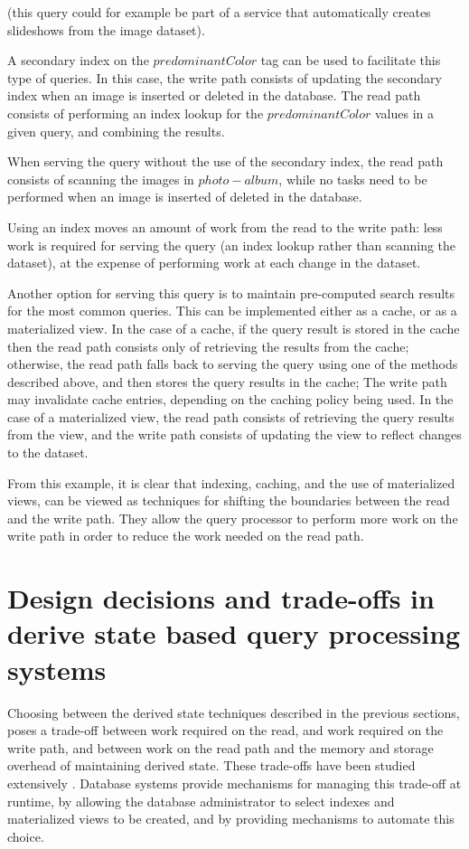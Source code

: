\noindent
(this query could for example be part of a service that automatically creates slideshows from the image dataset).

A secondary index on the $predominantColor$ tag can be used to facilitate this type of queries.
In this case, the write path consists of updating the secondary index when an image is inserted or deleted in the database.
The read path consists of performing an index lookup for the $predominantColor$ values in a given query,
and combining the results.

When serving the query without the use of the secondary index, the read path consists of scanning the images in $photo-album$,
while no tasks need to be performed when an image is inserted of deleted in the database.

Using an index moves an amount of work from the read to the write path:
less work is required for serving the query (an index lookup rather than scanning the dataset), at the expense of performing
work at each change in the dataset.

Another option for serving this query is to maintain pre-computed search results for the most common queries.
This can be implemented either as a cache, or as a materialized view.
In the case of a cache, if the query result is stored in the cache then the read path consists only of retrieving the
results from the cache;
otherwise, the read path falls back to serving the query using one of the methods described above,
and then stores the query results in the cache;
The write path may invalidate cache entries, depending on the caching policy being used.
In the case of a materialized view, the read path consists of retrieving the query results from the view,
and the write path consists of updating the view to reflect changes to the dataset.

From this example, it is clear that indexing, caching, and the use of materialized views,
can be viewed as techniques for shifting the boundaries between the read and the write path.
They allow the query processor to perform more work on the write path in order to reduce the work needed on the read path.


\section{Design decisions and trade-offs in derive state based query processing systems}

Choosing between the derived state techniques described in the previous sections,
poses a trade-off between work required on the read, and work required on the write path,
and between work on the read path and the memory and storage overhead of maintaining derived state.
These trade-offs have been studied extensively \cite{valentin:db2advisor, chaudhuri:decadeselftuning}.
Database systems provide mechanisms for managing this trade-off at runtime, by allowing the database administrator
to select indexes and materialized views to be created, and by providing mechanisms to automate this choice.

